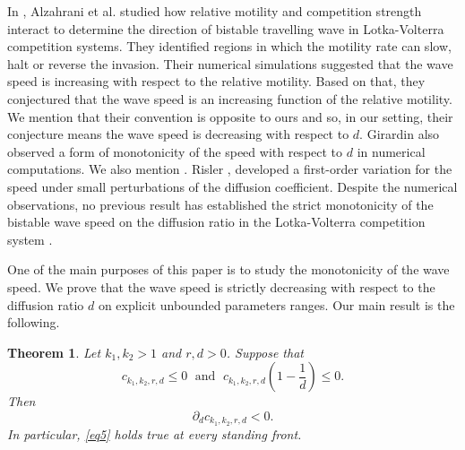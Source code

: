 \documentclass[11pt]{article}
\numberwithin{equation}{section}
\newcommand{\1}{\mathbbm{1}}
\numberwithin{equation}{section}
\newtheorem{theorem}{Theorem}[section]
\theoremstyle{definition}
\def \c{c_{k_1,k_2,r,d}}
\numberwithin{equation}{section}
\begin{document}
In \cite{alzahrani2012}, Alzahrani et al. studied how relative motility and competition strength interact to determine the direction of bistable travelling wave in Lotka-Volterra  competition systems. They identified regions in which the motility rate can slow, halt or reverse  the invasion.  Their numerical simulations suggested that the wave speed is increasing with respect to the relative motility. Based on that, they conjectured that the wave speed is an increasing function of the relative motility.  We mention that their convention is opposite to ours and so, in our setting, their conjecture means the wave speed is decreasing with respect to $d$. Girardin \cite{girardin2019}  also observed a form of monotonicity of the speed  with respect to $d$ in numerical computations. We also mention \cite{hosono1998}. Risler \cite{risler2017}, developed a first-order variation for the speed under small perturbations of the diffusion coefficient.  Despite the numerical observations, no previous result has established the strict monotonicity of the bistable wave speed on the diffusion ratio in the Lotka-Volterra competition system \cite{girardin2019, girardin2015, nakamura2026}. %

One of the main purposes of this paper is to study the monotonicity of the wave speed. We prove that the wave speed is strictly decreasing with respect to the diffusion ratio $d$ on explicit unbounded parameters ranges. Our main result is the following.
\begin{theorem}\label{maintheorem}
	Let $k_1,k_2>1$ and $r,d>0$. Suppose that 
\begin{equation}\label{condition0}
	\c\leq 0	 \; \text{ and }\; \c\left(1-\frac{1}{d}\right)\leq 0.
\end{equation}
	Then 
	\begin{equation}\label{eq5}
		\partial_d \c <0.
	\end{equation}             
In particular, \eqref{eq5} holds true at every standing front.
\end{theorem}
\end{document}
